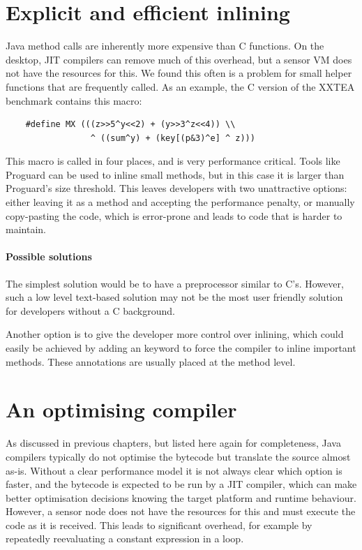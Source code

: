 \section{Explicit and efficient inlining}
\label{sec-inlining}
Java method calls are inherently more expensive than C functions. On the desktop, JIT compilers can remove much of this overhead, but a sensor VM does not have the resources for this. We found this often is a problem for small helper functions that are frequently called. As an example, the C version of the XXTEA benchmark contains this macro: 

\begin{verbatim}
    #define MX (((z>>5^y<<2) + (y>>3^z<<4)) \\
                 ^ ((sum^y) + (key[(p&3)^e] ^ z)))
\end{verbatim}

This macro is called in four places, and is very performance critical. Tools like Proguard \cite{proguard} can be used to inline small methods, but in this case it is larger than Proguard's size threshold. This leaves developers with two unattractive options: either leaving it as a method and accepting the performance penalty, or manually copy-pasting the code, which is error-prone and leads to code that is harder to maintain.

\paragraph{Possible solutions}
The simplest solution would be to have a preprocessor similar to C's. However, such a low level text-based solution may not be the most user friendly solution for developers without a C background.

Another option is to give the developer more control over inlining, which could easily be achieved by adding an  keyword to force the compiler to inline important methods. These annotations are usually placed at the method level.




\section{An optimising compiler}
\label{sec-optimising-javac}
As discussed in previous chapters, but listed here again for completeness, Java compilers typically do not optimise the bytecode but translate the source almost as-is. Without a clear performance model it is not always clear which option is faster, and the bytecode is expected to be run by a JIT compiler, which can make better optimisation decisions knowing the target platform and runtime behaviour. However, a sensor node does not have the resources for this and must execute the code as it is received. This leads to significant overhead, for example by repeatedly reevaluating a constant expression in a loop.

